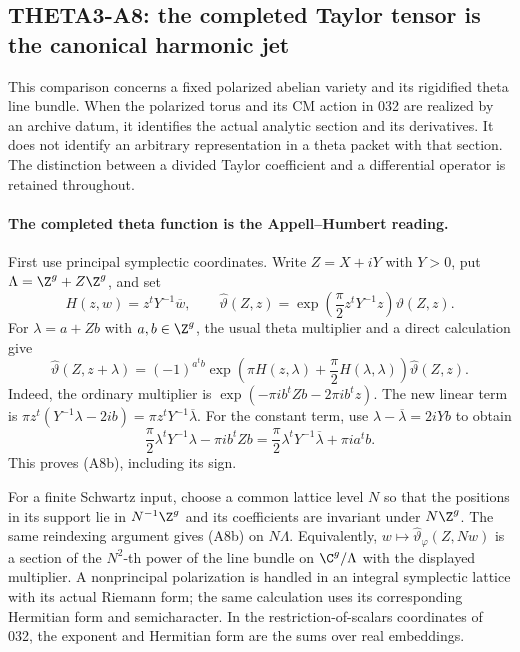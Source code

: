 \subsection{THETA3-A8: the completed Taylor tensor is the canonical harmonic jet}\label{A8}

This comparison concerns a fixed polarized abelian variety and its
rigidified theta line bundle.  When the polarized torus and its CM
action in 032 are realized by an archive datum, it identifies the
actual analytic section and its derivatives.  It does not identify
an arbitrary representation in a theta packet with that section.
The distinction between a divided Taylor coefficient and a
differential operator is retained throughout.

\paragraph{The completed theta function is the Appell--Humbert reading.}
First use principal symplectic coordinates.  Write $Z=X+iY$ with
$Y>0$, put $\Lambda=\Z^g+Z\Z^g$, and set
\[
 H(z,w)=z^tY^{-1}\overline w,\qquad
 \widehat\vartheta(Z,z)
       =\exp\left(\frac\pi2z^tY^{-1}z\right)\vartheta(Z,z).
 \tag{A8a}
\]
For $\lambda=a+Zb$ with $a,b\in\Z^g$, the usual theta multiplier
and a direct calculation give
\[
 \widehat\vartheta(Z,z+\lambda)
  =(-1)^{a^tb}
    \exp\left(\pi H(z,\lambda)+\frac\pi2H(\lambda,\lambda)\right)
       \widehat\vartheta(Z,z).
 \tag{A8b}
\]
Indeed, the ordinary multiplier is
$\exp(-\pi i b^tZb-2\pi i b^tz)$.  The new linear term is
$\pi z^t(Y^{-1}\lambda-2ib)=\pi z^tY^{-1}\overline\lambda$.
For the constant term, use
$\lambda-\overline\lambda=2iYb$ to obtain
\[
 \frac\pi2\lambda^tY^{-1}\lambda-\pi i b^tZb
  =\frac\pi2\lambda^tY^{-1}\overline\lambda+\pi i a^tb.
\]
This proves (A8b), including its sign.

For a finite Schwartz input, choose a common lattice level $N$ so
that the positions in its support lie in $N^{-1}\Z^g$ and its
coefficients are invariant under $N\Z^g$.  The same reindexing
argument gives (A8b) on $N\Lambda$.  Equivalently,
$w\mapsto\widehat\vartheta_\varphi(Z,Nw)$ is a section of the
$N^2$-th power of the line bundle on $\C^g/\Lambda$ with the
displayed multiplier.  A nonprincipal polarization is handled in
an integral symplectic lattice with its actual Riemann form; the
same calculation uses its corresponding Hermitian form and
semicharacter.  In the restriction-of-scalars coordinates of 032,
the exponent and Hermitian form are the sums over real embeddings.

